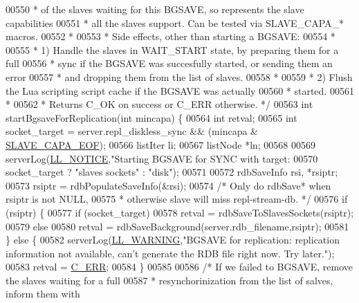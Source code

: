 \begin{DoxyCode}
{{{{{{{{{{{{{{{{{{{{{{{{{{{{00550 \textcolor{comment}{ * of the slaves waiting for this BGSAVE, so represents the slave capabilities}
00551 \textcolor{comment}{ * all the slaves support. Can be tested via SLAVE\_CAPA\_* macros.}
00552 \textcolor{comment}{ *}
00553 \textcolor{comment}{ * Side effects, other than starting a BGSAVE:}
00554 \textcolor{comment}{ *}
00555 \textcolor{comment}{ * 1) Handle the slaves in WAIT\_START state, by preparing them for a full}
00556 \textcolor{comment}{ *    sync if the BGSAVE was succesfully started, or sending them an error}
00557 \textcolor{comment}{ *    and dropping them from the list of slaves.}
00558 \textcolor{comment}{ *}
00559 \textcolor{comment}{ * 2) Flush the Lua scripting script cache if the BGSAVE was actually}
00560 \textcolor{comment}{ *    started.}
00561 \textcolor{comment}{ *}
00562 \textcolor{comment}{ * Returns C\_OK on success or C\_ERR otherwise. */}
00563 \textcolor{keywordtype}{int} startBgsaveForReplication(\textcolor{keywordtype}{int} mincapa) \{
00564     \textcolor{keywordtype}{int} retval;
00565     \textcolor{keywordtype}{int} socket\_target = server.repl\_diskless\_sync && (mincapa & 
      \hyperlink{server_8h_a679170caf08eeb16170fc653c9c1dfb2}{SLAVE\_CAPA\_EOF});
00566     listIter li;
00567     listNode *ln;
00568 
00569     serverLog(\hyperlink{server_8h_a8c54c191e436c7dd3012167212692401}{LL\_NOTICE},\textcolor{stringliteral}{"Starting BGSAVE for SYNC with target: %
00570         socket\_target ? \textcolor{stringliteral}{"slaves sockets"} : \textcolor{stringliteral}{"disk"});
00571 
00572     rdbSaveInfo rsi, *rsiptr;
00573     rsiptr = rdbPopulateSaveInfo(&rsi);
00574     \textcolor{comment}{/* Only do rdbSave* when rsiptr is not NULL,}
00575 \textcolor{comment}{     * otherwise slave will miss repl-stream-db. */}
00576     \textcolor{keywordflow}{if} (rsiptr) \{
00577         \textcolor{keywordflow}{if} (socket\_target)
00578             retval = rdbSaveToSlavesSockets(rsiptr);
00579         \textcolor{keywordflow}{else}
00580             retval = rdbSaveBackground(server.rdb\_filename,rsiptr);
00581     \} \textcolor{keywordflow}{else} \{
00582         serverLog(\hyperlink{server_8h_a31229b9334bba7d6be2a72970967a14b}{LL\_WARNING},\textcolor{stringliteral}{"BGSAVE for replication: replication information not available,
       can't generate the RDB file right now. Try later."});
00583         retval = \hyperlink{server_8h_af98ac28d5f4d23d7ed5985188e6fb7d1}{C\_ERR};
00584     \}
00585 
00586     \textcolor{comment}{/* If we failed to BGSAVE, remove the slaves waiting for a full}
00587 \textcolor{comment}{     * resynchorinization from the list of salves, inform them with}
}}}}}}}}}}}}}}}}}}}}}}}}}}}}}
\end{DoxyCode}
